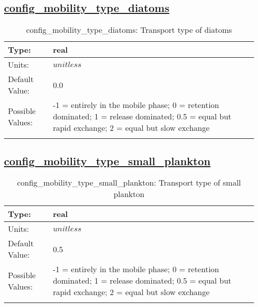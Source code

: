\subsection[config\_mobility\_type\_diatoms]{\hyperref[sec:nm_tab_biogeochemistry]{config\_mobility\_type\_diatoms}}
\label{subsec:nm_sec_config_mobility_type_diatoms}
\begin{center}
\begin{longtable}{| p{2.0in} || p{4.0in} |}
    \hline
    Type: & real \\
    \hline
    Units: & $unitless$ \\
    \hline
    Default Value: & 0.0 \\
    \hline
    Possible Values: & -1 = entirely in the mobile phase; 0 = retention dominated;     1 = release dominated; 0.5 = equal but rapid exchange;     2 = equal but slow exchange \\
    \hline
    \caption{config\_mobility\_type\_diatoms: Transport type of diatoms}
\end{longtable}
\end{center}
\subsection[config\_mobility\_type\_small\_plankton]{\hyperref[sec:nm_tab_biogeochemistry]{config\_mobility\_type\_small\_plankton}}
\label{subsec:nm_sec_config_mobility_type_small_plankton}
\begin{center}
\begin{longtable}{| p{2.0in} || p{4.0in} |}
    \hline
    Type: & real \\
    \hline
    Units: & $unitless$ \\
    \hline
    Default Value: & 0.5 \\
    \hline
    Possible Values: & -1 = entirely in the mobile phase; 0 = retention dominated;     1 = release dominated; 0.5 = equal but rapid exchange;     2 = equal but slow exchange \\
    \hline
    \caption{config\_mobility\_type\_small\_plankton: Transport type of small plankton}
\end{longtable}
\end{center}
